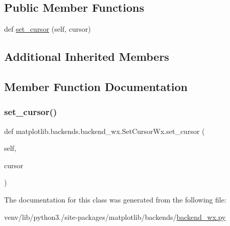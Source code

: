 \subsection*{Public Member Functions}
\begin{DoxyCompactItemize}
\item 
def \hyperlink{classmatplotlib_1_1backends_1_1backend__wx_1_1SetCursorWx_aca091e918a6d9e53bdf1e242b219578f}{set\+\_\+cursor} (self, cursor)
\end{DoxyCompactItemize}
\subsection*{Additional Inherited Members}


\subsection{Member Function Documentation}
\mbox{\label{classmatplotlib_1_1backends_1_1backend__wx_1_1SetCursorWx_aca091e918a6d9e53bdf1e242b219578f}} 
\subsubsection{\texorpdfstring{set\+\_\+cursor()}{set\_cursor()}}
{\footnotesize\ttfamily def matplotlib.\+backends.\+backend\+\_\+wx.\+Set\+Cursor\+Wx.\+set\+\_\+cursor (\begin{DoxyParamCaption}\item[{}]{self,  }\item[{}]{cursor }\end{DoxyParamCaption})}



The documentation for this class was generated from the following file\+:\begin{DoxyCompactItemize}
\item 
venv/lib/python3./site-\/packages/matplotlib/backends/\hyperlink{backend__wx_8py}{backend\+\_\+wx.\+py}\end{DoxyCompactItemize}
